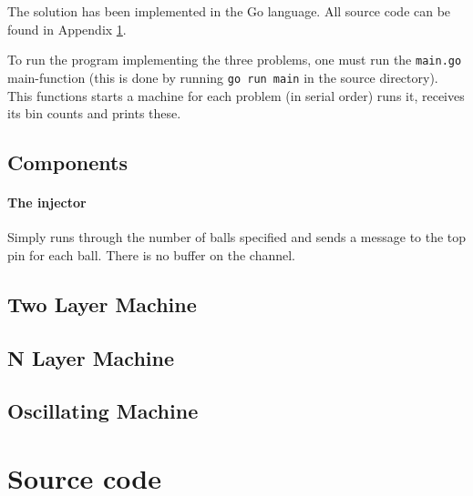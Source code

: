 \documentclass[a4paper, 11pt]{article}
\begin{document}
The solution has been implemented in the Go language. All source code can be found in Appendix \ref{sec:source_code}.

To run the program implementing the three problems, one must run the \texttt{main.go} main-function (this is done by running \texttt{go run main} in the source directory). This functions starts a machine for each problem (in serial order) runs it, receives its bin counts and prints these.

\subsection{Components} %
\label{sub:components}

\paragraph{The injector} %
\label{par:the_injector}

Simply runs through the number of balls specified and sends a message to the top pin for each ball. There is no buffer on the channel.



\subsection{Two Layer Machine} %
\label{sub:two_layer_machine}


\subsection{N Layer Machine} %
\label{sub:n_layer_machine}


\subsection{Oscillating Machine} %
\label{sub:oscillating_machine}



\appendix
\section{Source code} %
\label{sec:source_code}

\inputminted[fontsize=\scriptsize, frame=topline, label=machine.go, linenos=true]{go}{../src/machine.go}

\inputminted[fontsize=\scriptsize, frame=topline, label=main.go, linenos=true]{go}{../src/main.go}


\end{document}
